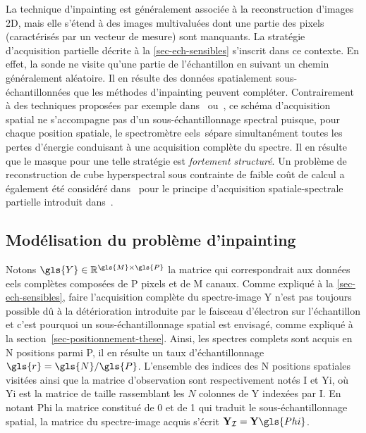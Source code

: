 La technique d'inpainting est généralement associée à la reconstruction d'images 2D, mais elle s'étend à des images multivaluées dont une partie des pixels (caractérisés par un vecteur de mesure) sont manquants.
%
La stratégie d'acquisition partielle décrite à la \cref{sec-ech-sensibles} s'inscrit dans ce contexte. En effet, la sonde ne visite qu'une partie de l'échantillon en suivant un chemin généralement aléatoire. Il en résulte des données spatialement sous-échantillonnées que les méthodes d'inpainting peuvent compléter.
%
Contrairement à des techniques proposées par exemple dans~\cite{gehm2007single} ou~\cite{mcgregor2015adaptive}, ce schéma d'acquisition spatial ne s'accompagne pas d'un sous-échantillonnage spectral puisque, pour chaque position spatiale, le spectromètre \gls{eels} sépare simultanément toutes les pertes d'énergie conduisant à une acquisition complète du spectre. Il en résulte que le masque pour une telle stratégie est \emph{fortement structuré}.
%
Un problème de reconstruction de cube hyperspectral sous contrainte de faible coût de calcul a également été considéré dans~\cite{ardi2018fast} pour le principe d'acquisition spatiale-spectrale partielle introduit dans~\cite{mcgregor2015adaptive}.


\subsection{Modélisation du problème d'inpainting}\label{subsec-direct-inverse-problem}

Notons $\gls{Y}\in\mathbb{R}^{\gls{M}\times\gls{P}}$ la matrice qui correspondrait aux données \gls{eels} complètes composées de \gls{P} pixels et de \gls{M} canaux. 
%
Comme expliqué à la \cref{sec-ech-sensibles}, faire l'acquisition complète du spectre-image \gls{Y} n'est pas toujours possible dû à la détérioration introduite par le faisceau d'électron sur l'échantillon et c'est pourquoi un sous-échantillonnage spatial est envisagé, comme expliqué à la section~\ref{sec-positionnement-these}.
%
Ainsi, les spectres complets sont acquis en \gls{N} positions parmi \gls{P}, il en résulte un taux d'échantillonnage $\gls{r}=\gls{N}/\gls{P}$. L'ensemble des indices des \gls{N} positions spatiales visitées ainsi que la matrice d'observation sont respectivement notés \gls{I} et \gls{Yi}, où \gls{Yi} est la matrice de taille  rassemblant les $N$ colonnes de \gls{Y} indexées par \gls{I}. En notant \gls{Phi} la matrice constitué de 0 et de 1 qui traduit le sous-échantillonnage spatial, la matrice du spectre-image acquis s'écrit $\mathbf{Y}_{\mathcal{I}}=\mathbf{Y} \gls{Phi}$.%

